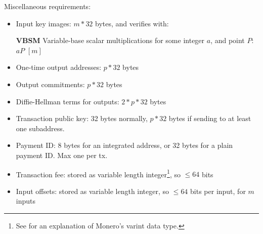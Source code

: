 Miscellaneous requirements:
\begin{itemize}
    \setlength\itemsep{\listspace}
    \item Input key images: $m*32$ bytes, and verifies with:
    \item [\textbf{VBSM}] Variable-base scalar multiplications for some integer $a$, and point $P$: $a P$ \quad \([m]\)
    \item One-time output addresses: $p*32$ bytes
    \item Output commitments: $p*32$ bytes
    \item Diffie-Hellman terms for outputs: $2*p*32$ bytes
    \item Transaction public key: 32 bytes normally, $p*32$ bytes if sending to at least one subaddress.
    \item Payment ID: 8 bytes for an integrated address, or 32 bytes for a plain payment ID. Max one per tx.
    \item Transaction fee: stored as variable length integer\footnote{See \cite{varint-description} for an explanation of Monero's varint data type.}, so $\leq 64$ bits
    \item Input offsets: stored as variable length integer, so $\leq 64$ bits per input, for $m$ inputs
\end{itemize}
